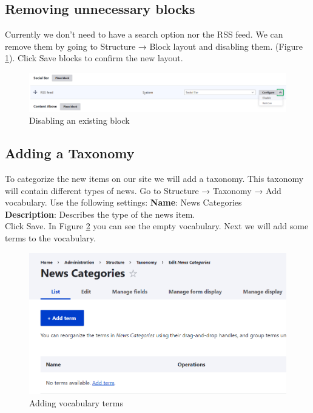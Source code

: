 \subsection{Removing unnecessary blocks}
Currently we don't need to have a search option nor the RSS feed. We can remove them by going to Structure → Block layout and disabling them. (Figure \ref{fig:admin_disable_block}). Click Save blocks to confirm the new layout.

\begin{figure}[H]
    \centering
    \includegraphics[width=1\linewidth]{img/ch4/admin_disable_block}
    \caption{Disabling an existing block }
    \label{fig:admin_disable_block}
\end{figure}

\subsection{Adding a Taxonomy}
To categorize the new items on our site we will add a taxonomy. This taxonomy will contain different types of news. Go to Structure → Taxonomy → Add vocabulary. Use the following settings:
\textbf{Name}: News Categories
\\
\textbf{Description}: Describes the type of the news item.
\\
Click Save. In Figure \ref{fig:admin_taxonomy_terms} you can see the empty vocabulary. Next we will add some terms to the vocabulary.

\begin{figure}[H]
    \centering
    \includegraphics[width=1\linewidth]{img/ch4/admin_taxonomy_terms}
    \caption{Adding vocabulary terms }
    \label{fig:admin_taxonomy_terms}
\end{figure}

